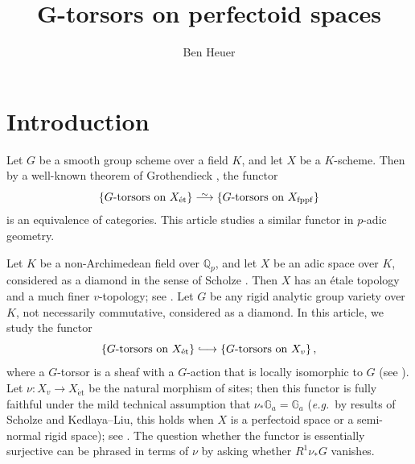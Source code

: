 \documentclass[11pt]{amsart}
\title{$\boldsymbol{G}$-torsors on perfectoid spaces}
\author{Ben Heuer}
\numberwithin{equation}{section}
\theoremstyle{definition}
\theoremstyle{remark}
\newcommand{\lra}{\longrightarrow}
\newcommand*{\lowsim}{\vbox to 0pt{\vss\hbox{$\scriptstyle\sim$}\vskip-2pt}}
\newcommand*{\longisomarrow}{\stackrel{\lowsim}{\lra}}
\newcommand*{\longhookrightarrow}{\lhook\joinrel\longrightarrow}
\newcommand{\G}{\mathbb{G}}
\newcommand{\Q}{\mathbb{Q}}
\newcommand{\et}{{\operatorname{\acute{e}t}}}
\begin{document}


\maketitle


\begin{prelims}

\DisplayAbstractInEnglish

\bigskip

\DisplayKeyWords

\medskip

\DisplayMSCclass

\end{prelims}



\newpage

\setcounter{tocdepth}{1}

\tableofcontents



	
\section{Introduction}
	Let $G$ be a smooth group scheme over a field $K$, and let $X$ be a $K$-scheme. Then by a well-known theorem of Grothendieck \cite[Th\'eor\`eme~11.7, Remark~11.8]{Grothendieck_BrauerIII}, the functor
	\[ \left\{ \text{$G$-torsors on $X_{\et}$}\right\}\longisomarrow \left\{\text{$G$-torsors on $X_{\mathrm{fppf}}$}\right\}\]
	is an equivalence of categories. This article studies a similar functor in $p$-adic geometry. 
	
	Let $K$ be a non-Archimedean field over $\Q_p$, and let $X$ be an adic space over $K$, considered as a diamond in the sense of Scholze \cite[Section~15]{etale-cohomology-of-diamonds}.
        Then $X$ has an \'etale topology and a much finer $v$-topology; see \cite[Section~14]{etale-cohomology-of-diamonds}.
	Let $G$ be any rigid analytic group variety over $K$, not necessarily commutative, considered as a diamond. In this article, we study the functor
	\[ \left\{ \text{$G$-torsors on $X_{\et}$}\right\}\longhookrightarrow \left\{\text{$G$-torsors on $X_{v}$}\right\},\]
	where a $G$-torsor is a sheaf with a $G$-action that is locally isomorphic to $G$ (see ). Let
	$\nu\colon X_v\to X_{\et}$ be the natural morphism of sites; then this functor is fully faithful under the mild technical assumption that $\nu_\ast \mathbb G_a=\G_a$ (\textit{e.g.}~by
        results of Scholze and Kedlaya--Liu, this holds when $X$ is a perfectoid space or a semi-normal rigid space); see . The question whether the functor is essentially surjective can be phrased in terms of $\nu$
	by asking whether $R^1\nu_{\ast}G$  vanishes.
	
\end{document}
